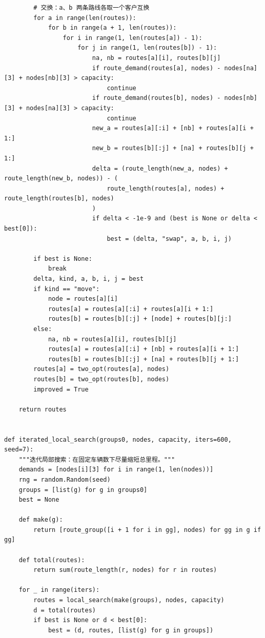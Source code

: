 \documentclass[12pt,a4paper]{ctexart}
\begin{document}
\begin{lstlisting}
        # 交换：a、b 两条路线各取一个客户互换
        for a in range(len(routes)):
            for b in range(a + 1, len(routes)):
                for i in range(1, len(routes[a]) - 1):
                    for j in range(1, len(routes[b]) - 1):
                        na, nb = routes[a][i], routes[b][j]
                        if route_demand(routes[a], nodes) - nodes[na][3] + nodes[nb][3] > capacity:
                            continue
                        if route_demand(routes[b], nodes) - nodes[nb][3] + nodes[na][3] > capacity:
                            continue
                        new_a = routes[a][:i] + [nb] + routes[a][i + 1:]
                        new_b = routes[b][:j] + [na] + routes[b][j + 1:]
                        delta = (route_length(new_a, nodes) + route_length(new_b, nodes)) - (
                            route_length(routes[a], nodes) + route_length(routes[b], nodes)
                        )
                        if delta < -1e-9 and (best is None or delta < best[0]):
                            best = (delta, "swap", a, b, i, j)

        if best is None:
            break
        delta, kind, a, b, i, j = best
        if kind == "move":
            node = routes[a][i]
            routes[a] = routes[a][:i] + routes[a][i + 1:]
            routes[b] = routes[b][:j] + [node] + routes[b][j:]
        else:
            na, nb = routes[a][i], routes[b][j]
            routes[a] = routes[a][:i] + [nb] + routes[a][i + 1:]
            routes[b] = routes[b][:j] + [na] + routes[b][j + 1:]
        routes[a] = two_opt(routes[a], nodes)
        routes[b] = two_opt(routes[b], nodes)
        improved = True

    return routes


def iterated_local_search(groups0, nodes, capacity, iters=600, seed=7):
    """迭代局部搜索：在固定车辆数下尽量缩短总里程。"""
    demands = [nodes[i][3] for i in range(1, len(nodes))]
    rng = random.Random(seed)
    groups = [list(g) for g in groups0]
    best = None

    def make(g):
        return [route_group([i + 1 for i in gg], nodes) for gg in g if gg]

    def total(routes):
        return sum(route_length(r, nodes) for r in routes)

    for _ in range(iters):
        routes = local_search(make(groups), nodes, capacity)
        d = total(routes)
        if best is None or d < best[0]:
            best = (d, routes, [list(g) for g in groups])


\end{lstlisting}
\end{document}
